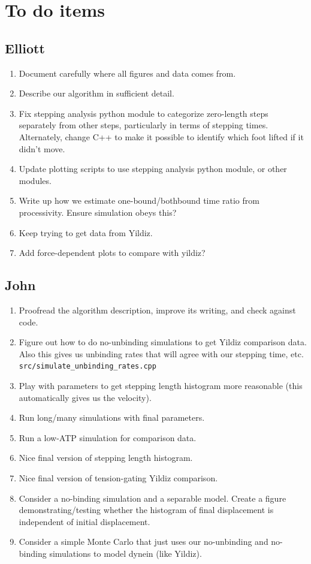 \documentclass[9pt,twocolumn,twoside]{pnas-new}
\begin{document}
\showmatmethods

\section{To do items}

\subsection{Elliott}
\begin{enumerate}
\item Document carefully where all figures and data comes from.
\item Describe our algorithm in sufficient detail.
\item Fix stepping analysis python module to categorize zero-length
  steps separately from other steps, particularly in terms of stepping
  times.  Alternately, change C++ to make it possible to identify
  which foot lifted if it didn't move.
\item Update plotting scripts to use stepping analysis python module,
  or other modules.
\item Write up how we estimate one-bound/bothbound time ratio from
  processivity.  Ensure simulation obeys this?
\item Keep trying to get data from Yildiz.
\item Add force-dependent plots to compare with yildiz?
\end{enumerate}

\subsection{John}
\begin{enumerate}
\item Proofread the algorithm description, improve its writing, and
  check against code.
\item Figure out how to do no-unbinding simulations to get Yildiz
  comparison data.  Also this gives us unbinding rates that will agree
  with our stepping time, etc. \verb!src/simulate_unbinding_rates.cpp!
\item Play with parameters to get stepping length histogram more
  reasonable (this automatically gives us the velocity).
\item Run long/many simulations with final parameters.
\item Run a low-ATP simulation for comparison data.
\item Nice final version of stepping length histogram.
\item Nice final version of tension-gating Yildiz comparison.
\item Consider a no-binding simulation and a separable model.  Create
  a figure demonstrating/testing whether the histogram of final
  displacement is independent of initial displacement.
\item Consider a simple Monte Carlo that just uses our no-unbinding
  and no-binding simulations to model dynein (like Yildiz).
\end{enumerate}
\end{document}

